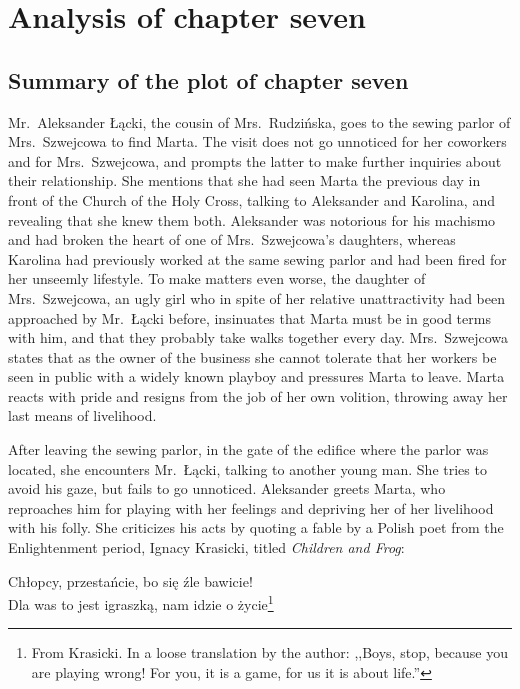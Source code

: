 
\section{Analysis of chapter seven}

\subsection{Summary of the plot of chapter seven}

Mr.\ Aleksander Łącki, the cousin of Mrs.\ Rudzińska, goes to the sewing parlor of Mrs.\ Szwejcowa to find Marta.
The visit does not go unnoticed for her coworkers and for Mrs.\ Szwejcowa, and prompts the latter to make further inquiries about their relationship.
She mentions that she had seen Marta the previous day in front of the Church of the Holy Cross, talking to Aleksander and Karolina, and revealing that she knew them both.
Aleksander was notorious for his machismo and had broken the heart of one of Mrs.\ Szwejcowa's daughters, whereas Karolina had previously worked at the same sewing parlor and had been fired for her unseemly lifestyle.
To make matters even worse, the daughter of Mrs.\ Szwejcowa, an ugly girl who in spite of her relative unattractivity had been approached by Mr.\ Łącki before, insinuates that Marta must be in good terms with him, and that they probably take walks together every day.
Mrs.\ Szwejcowa states that as the owner of the business she cannot tolerate that her workers be seen in public with a widely known playboy and pressures Marta to leave.
Marta reacts with pride and resigns from the job of her own volition, throwing away her last means of livelihood.

After leaving the sewing parlor, in the gate of the edifice where the parlor was located, she encounters Mr.\ Łącki, talking to another young man.
She tries to avoid his gaze, but fails to go unnoticed.
Aleksander greets Marta, who reproaches him for playing with her feelings and depriving her of her livelihood with his folly.
She criticizes his acts by quoting a fable by a Polish poet from the Enlightenment period, Ignacy Krasicki, titled \textit{Children and Frog}:

\begin{displayquote}
    Chłopcy, przestańcie, bo się źle bawicie!\\
    Dla was to jest igraszką, nam idzie o życie\footnote{%
      From Krasicki. In a loose translation by the author: ,,Boys, stop, because you are playing wrong! For you, it is a game, for us it is about life.''}
\end{displayquote}

